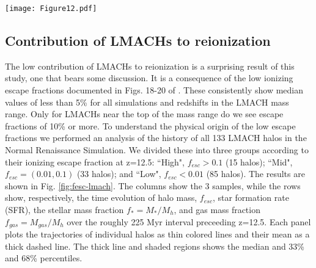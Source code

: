 \documentclass[iop,apj]{emulateapj}
\begin{document}
\begin{figure*}
\centering \texttt{[image: Figure12.pdf]}
\caption{Evolution of the LMACH population in the Normal simulation. The LMACHs are divided into three categories depending on their $f_{esc}$ at z=12.5: high ($f_{esc}>0.1$, left column); mid ($f_{esc}=(0.01,0.1)$, center column); low ($f_{esc}<0.01$, right column). 
The number of halos in each category are given in the upper left corner of the first row of figures.
Going down each column we plot the halo virial mass $M_h$, the ionizing escape fraction $f_{esc}$, the star formation rate (SFR), the stellar and gas fractions $f_{*}=M_{*}/M_h, f_{gas}=M_{gas}/M_h$, and the ratio of the total ionizing emissvity to the number of HI atoms within the virial radius. Thin lines plot individual halo trajectories. The thick dashed line plots the mean of the distribution at each time. The thick line and shaded regions shows the median and 33\% and 68\% percentiles.} 
\label{fig:fesc-lmach}
\end{figure*}

\subsection{Contribution of LMACHs to reionization}
\label{subsec:lmachs}
The low contribution of LMACHs to reionization is a surprising result of this study, one that bears some discussion. It is a consequence of the low ionizing escape fractions documented in Figs. 18-20 of \cite{Xu16}. These consistently show median values of less than 5\% for all simulations and redshifts in the LMACH mass range. Only for LMACHs near the top of the mass range do we see escape fractions of 10\% or more. To understand the physical origin of the low escape fractions we performed an analysis of the history of all 133 LMACH halos in the Normal Renaissance Simulation. We divided these into three groups according to their ionizing escape fraction at z=12.5: ``High", $f_{esc}>0.1$ (15 halos); ``Mid", $f_{esc}=(0.01,0.1)$ (33 halos); and ``Low",  $f_{esc}<0.01$ (85 halos). The results are shown in Fig. \ref{fig:fesc-lmach}. The columns show the 3 samples, while the rows show, respectively, the time evolution of halo mass, $f_{esc}$, star formation rate (SFR), the stellar mass fraction $f_{*}=M_{*}/M_h$, and gas mass fraction $f_{gas}=M_{gas}/M_h$ over the roughly 225 Myr interval preceeding z=12.5. Each panel plots the trajectories of individual halos as thin colored lines and their mean as a thick dashed line.  The thick line and shaded regions shows the median and 33\% and 68\% percentiles.
\end{document}

